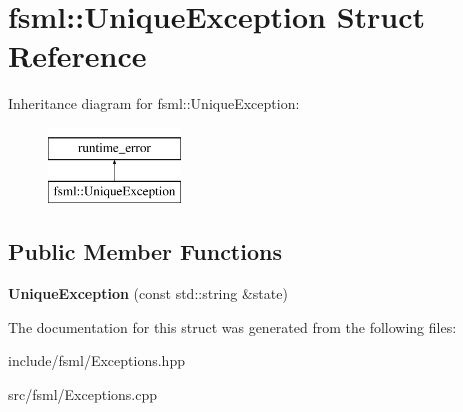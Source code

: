 \hypertarget{structfsml_1_1UniqueException}{\section{fsml\-:\-:Unique\-Exception Struct Reference}
\label{structfsml_1_1UniqueException}
}
Inheritance diagram for fsml\-:\-:Unique\-Exception\-:\begin{figure}[H]
\begin{center}
\leavevmode
\includegraphics[height=2.000000cm]{structfsml_1_1UniqueException}
\end{center}
\end{figure}
\subsection*{Public Member Functions}
\begin{DoxyCompactItemize}
\item 
\hypertarget{structfsml_1_1UniqueException_a14fc471605daa57d638a35756fa66901}{{\bfseries Unique\-Exception} (const std\-::string \&state)}\label{structfsml_1_1UniqueException_a14fc471605daa57d638a35756fa66901}

\end{DoxyCompactItemize}


The documentation for this struct was generated from the following files\-:\begin{DoxyCompactItemize}
\item 
include/fsml/Exceptions.\-hpp\item 
src/fsml/Exceptions.\-cpp\end{DoxyCompactItemize}
